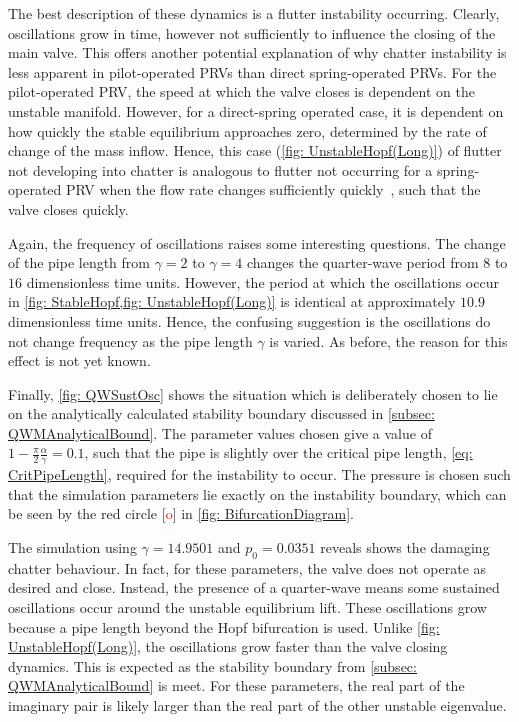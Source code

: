 \newpage
The best description of these dynamics is a flutter instability occurring. Clearly, oscillations grow in time, however not sufficiently to influence the closing of the main valve. This offers another potential explanation of why chatter instability is less apparent in pilot-operated PRVs than direct spring-operated PRVs.
For the pilot-operated PRV, the speed at which the valve closes is dependent on the unstable manifold. However, for a direct-spring operated case, it is dependent on how quickly the stable equilibrium approaches zero, determined by the rate of change of the mass inflow.
Hence, this case (\cref{fig: UnstableHopf(Long)}) of flutter not developing into chatter is analogous to flutter not occurring for a spring-operated PRV when the flow rate changes sufficiently quickly~\cite{Hos2017DynamicRecommendations}, such that the valve closes quickly.

Again, the frequency of oscillations raises some interesting questions. The change of the pipe length from $\gamma = 2$ to $\gamma = 4$ changes the quarter-wave period from $8$ to $16$ dimensionless time units. However, the period at which the oscillations occur in \cref{fig: StableHopf,fig: UnstableHopf(Long)} is identical at approximately $10.9$ dimensionless time units. Hence, the confusing suggestion is the oscillations do not change frequency as the pipe length $\gamma$ is varied. As before, the reason for this effect is not yet known.

Finally, \cref{fig: QWSustOsc} shows the situation which is deliberately chosen to lie on the analytically calculated stability boundary discussed in \cref{subsec: QWMAnalyticalBound}. The parameter values chosen give a value of $1 - \frac{\pi}{2} \frac{\alpha}{\gamma} = 0.1$, such that the pipe is slightly over the critical pipe length, \cref{eq: CritPipeLength}, required for the instability to occur. The pressure is chosen such that the simulation parameters lie exactly on the instability boundary, which can be seen by the red circle [\textcolor{Red}{o}] in \cref{fig: BifurcationDiagram}.
~


The simulation using $\gamma = 14.9501$ and $p_0 = 0.0351$ reveals shows the damaging chatter behaviour. In fact, for these parameters, the valve does not operate as desired and close. Instead, the presence of a quarter-wave means some sustained oscillations occur around the unstable equilibrium lift. These oscillations grow because a pipe length beyond the Hopf bifurcation is used. Unlike \cref{fig: UnstableHopf(Long)}, the oscillations grow faster than the valve closing dynamics. This is expected as the stability boundary from \cref{subsec: QWMAnalyticalBound} is meet. For these parameters, the real part of the imaginary pair is likely larger than the real part of the other unstable eigenvalue.

